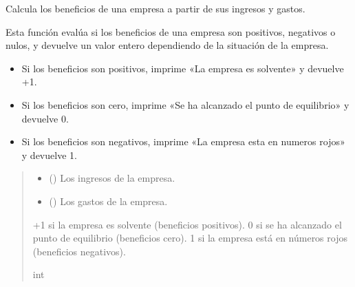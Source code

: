 \documentclass[letterpaper,10pt,spanish]{sphinxmanual}
\begin{document}
\begin{fulllineitems}
\label{\detokenize{pr5:pr5.2.evaluar_beneficios}}
\pysigstartsignatures
{}
\pysigstopsignatures
\sphinxAtStartPar
Calcula los beneficios de una empresa a partir de sus ingresos y gastos.

\sphinxAtStartPar
Esta función evalúa si los beneficios de una empresa son positivos, negativos o nulos,
y devuelve un valor entero dependiendo de la situación de la empresa.
\begin{itemize}
\item {} 
\sphinxAtStartPar
Si los beneficios son positivos, imprime «La empresa es solvente» y devuelve +1.

\item {} 
\sphinxAtStartPar
Si los beneficios son cero, imprime «Se ha alcanzado el punto de equilibrio» y devuelve 0.

\item {} 
\sphinxAtStartPar
Si los beneficios son negativos, imprime «La empresa esta en numeros rojos» y devuelve \sphinxhyphen{}1.

\end{itemize}
\begin{quote}\begin{description}
\begin{itemize}
\item {} 
\sphinxAtStartPar
{} () \textendash{} Los ingresos de la empresa.

\item {} 
\sphinxAtStartPar
{} () \textendash{} Los gastos de la empresa.

\end{itemize}

\sphinxAtStartPar
+1 si la empresa es solvente (beneficios positivos).
0 si se ha alcanzado el punto de equilibrio (beneficios cero).
\sphinxhyphen{}1 si la empresa está en números rojos (beneficios negativos).

\sphinxAtStartPar
int

\end{description}\end{quote}

\end{fulllineitems}
\end{document}
